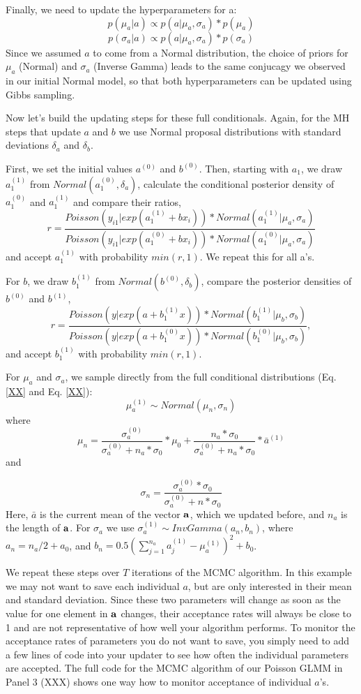 Finally, we need to update the hyperparameters for a:
\[
p(\mu_a|a) \propto p(a|\mu_a, \sigma_a) *p(\mu_a)
\]
\[
p(\sigma_a|a) \propto p(a|\mu_a, \sigma_a) *p(\sigma_a)
\]
Since we assumed $a$ to come from a Normal distribution, the choice of priors for $\mu_a$ (Normal) and $\sigma_a$ (Inverse Gamma) leads to the same conjucagy we observed in our initial Normal model, so that both hyperparameters can be updated using Gibbs sampling.

Now let's build the updating steps for these full conditionals. Again, for the MH steps that update $a$ and $b$ we use Normal proposal distributions with standard deviations $\delta_{a}$ and $\delta_{b}$.

First, we set the initial values $a^{(0)}$ and $b^{(0)}$. Then, starting with $a_1$, we draw $a_1^{(1)}$ from $Normal (a_1^{(0)}, \delta_{a})$, calculate the conditional posterior density of $a_1^{(0)}$ and $a_1^{(1)}$  and compare their ratios,
\[
r = \frac{Poisson(y_{i1}|exp(a_1^{(1)} + bx_i)) * Normal(a_1^{(1)}|\mu_a, \sigma_a)} {Poisson(y_{i1}|exp(a_1^{(0)} + bx_i)) * Normal(a_1^{(0)}|\mu_a, \sigma_a)}
\]
and accept $a_1^{(1)}$ with probability $min(r,1)$. We repeat this for all a's.

For $b$, we draw $b_1^{(1)}$ from $Normal (b^{(0)}, \delta_{b})$, compare the posterior densities of $b^{(0)}$ and $b^{(1)}$,
\[
r = \frac{Poisson(y|exp(a + b_1^{(1)}x)) *Normal(b_1^{(1)}|\mu_b, \sigma_b)} { Poisson(y|exp(a + b_1^{(0)}x)) *Normal(b_1^{(0)}|\mu_b, \sigma_b)},
\]
and accept $b_1^{(1)}$  with probability $min(r,1)$.

For $\mu_a$ and $\sigma_a$, we sample directly from the full conditional distributions (Eq. \ref{XX}  and Eq. \ref{XX}):
\[
\mu_a^{(1)} \sim Normal (\mu_n, \sigma_n)
\]
where 
\[\mu_n =  \frac{\sigma_a^{(0)}}  {\sigma_a^{(0)}   +n_a  *  \sigma_0} *  \mu_0 +  \frac{n_a * \sigma_0} {\sigma_a^{(0)}   +n_a* \sigma_0} *\bar{a}^{(1)}
\]
and 

\[
\sigma_n= \frac{\sigma_a^{(0)}  * \sigma_0 } {\sigma_a^{(0)}  + n* \sigma_0}
\]
Here, $\bar{a}$ is the current mean of the vector $\bf{a}$, which we updated before, and $n_a$ is the length of $\bf{a}$. For $\sigma_a$ we use $\sigma_a^{(1)}\sim Inv Gamma (a_n, b_n)$,
where  $a_n = n_a/2   + a_0$, and $b_n = 0.5 ( \displaystyle\sum\limits_{j=1}^{n_a} a_j^{(1)}-\mu_a^{(1)})^2+ b_0$.

We repeat these steps over $T$ iterations of the MCMC algorithm.
In this example we may not want to save each individual $a$, but are only interested in their mean and standard deviation. Since these two parameters will change as soon as the value for one element in $\bf{a}$ changes, their acceptance rates will always be close to 1 and are not representative of how well your algorithm performs. To monitor the acceptance rates of parameters you do not want to save, you simply need to add a few lines of code into your updater to see how often the individual parameters are accepted. The full code for the MCMC algorithm of our Poisson GLMM in Panel 3 (XXX) shows one way how to monitor acceptance of individual $a$'s.

